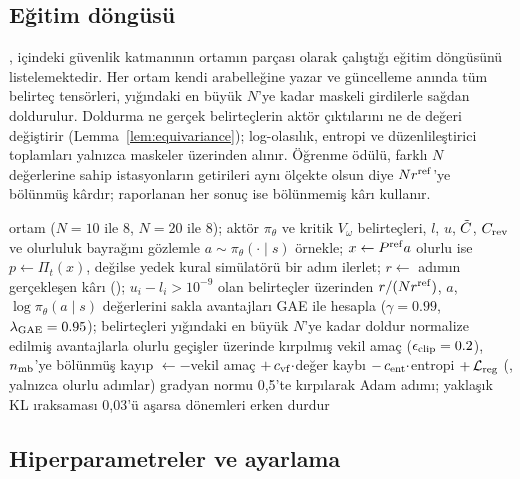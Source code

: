 \subsection{Eğitim döngüsü}\label{app:ppo}

,  içindeki güvenlik katmanının ortamın parçası olarak çalıştığı \method{} eğitim döngüsünü listelemektedir.
Her ortam kendi arabelleğine yazar ve güncelleme anında tüm belirteç tensörleri, yığındaki en büyük $N$'ye kadar maskeli girdilerle sağdan doldurulur.
Doldurma ne gerçek belirteçlerin aktör çıktılarını ne de değeri değiştirir (Lemma~\ref{lem:equivariance}); log-olasılık, entropi ve düzenlileştirici toplamları yalnızca maskeler üzerinden alınır.
Öğrenme ödülü, farklı $N$ değerlerine sahip istasyonların getirileri aynı ölçekte olsun diye $N r^{\mathrm{ref}}$'ye bölünmüş kârdır; raporlanan her sonuç ise bölünmemiş kârı kullanır.

\begin{algorithm}[t]
\caption{Değişken sayıda şarj ünitesiyle \method{} için PPO eğitimi}\label{alg:ppo}
\begin{algorithmic}[1]
 ortam ($N=10$ ile 8, $N=20$ ile 8); aktör $\pi_\theta$ ve kritik $V_\omega$
    \State belirteçleri, $l$, $u$, $\tilde C$, $C_{\mathrm{rev}}$ ve olurluluk bayrağını gözlemle
    \State $a\sim\pi_\theta(\cdot\mid s)$ örnekle; $x\gets P^{\mathrm{ref}}a$
    \State olurlu ise $p\gets\Pi_t(x)$, değilse yedek kural 
    \State simülatörü bir adım ilerlet; $r\gets$ adımın gerçekleşen kârı (); $u_i-l_i>10^{-9}$ olan belirteçler üzerinden $r/(N r^{\mathrm{ref}})$, $a$, $\log\pi_\theta(a\mid s)$ değerlerini sakla
  \EndFor
  \State avantajları GAE ile hesapla ($\gamma=0.99$, $\lambda_{\mathrm{GAE}}=0.95$); belirteçleri yığındaki en büyük $N$'ye kadar doldur
    \State normalize edilmiş avantajlarla olurlu geçişler üzerinde kırpılmış vekil amaç ($\epsilon_{\mathrm{clip}}=0.2$), $n_{\mathrm{mb}}$'ye bölünmüş
    \State kayıp $\gets-$vekil amaç $+\,c_{\mathrm{vf}}\cdot$değer kaybı $-\,c_{\mathrm{ent}}\cdot$entropi $+\,\mathcal L_{\mathrm{reg}}$ (, yalnızca olurlu adımlar)
    \State gradyan normu 0,5'te kırpılarak Adam adımı; yaklaşık KL ıraksaması 0,03'ü aşarsa dönemleri erken durdur
  \EndFor
\EndWhile
\end{algorithmic}
\end{algorithm}

\subsection{Hiperparametreler ve ayarlama}\label{app:hyper}

